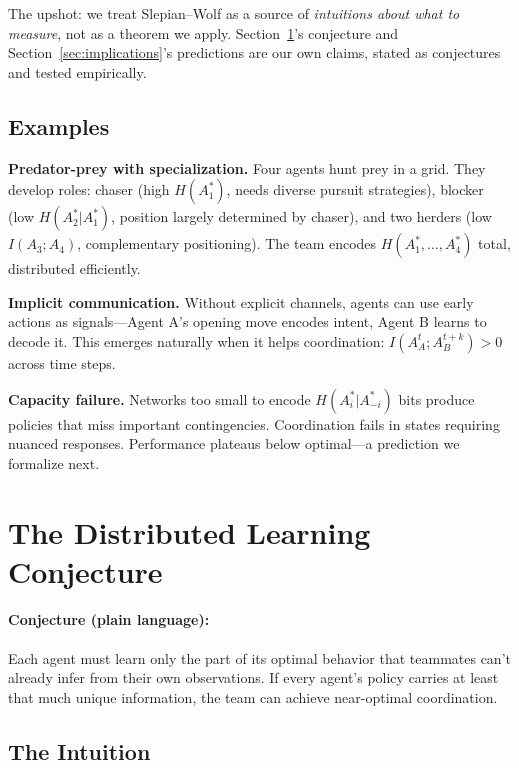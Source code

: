 \documentclass[10pt, letterpaper]{article}
\begin{document}
The upshot: we treat Slepian--Wolf as a source of \emph{intuitions about what to measure}, not as a theorem we apply. Section~\ref{sec:conjecture}'s conjecture and Section~\ref{sec:implications}'s predictions are our own claims, stated as conjectures and tested empirically.

\subsection{Examples}

\textbf{Predator-prey with specialization.} Four agents hunt prey in a grid. They develop roles: chaser (high $H(A_1^*)$, needs diverse pursuit strategies), blocker (low $H(A_2^*|A_1^*)$, position largely determined by chaser), and two herders (low $I(A_3; A_4)$, complementary positioning). The team encodes $H(A_1^*, \ldots, A_4^*)$ total, distributed efficiently.

\textbf{Implicit communication.} Without explicit channels, agents can use early actions as signals---Agent A's opening move encodes intent, Agent B learns to decode it. This emerges naturally when it helps coordination: $I(A_A^t; A_B^{t+k}) > 0$ across time steps.

\textbf{Capacity failure.} Networks too small to encode $H(A_i^*|A_{-i}^*)$ bits produce policies that miss important contingencies. Coordination fails in states requiring nuanced responses. Performance plateaus below optimal---a prediction we formalize next.

\section{The Distributed Learning Conjecture}
\label{sec:conjecture}

\paragraph{Conjecture (plain language):} Each agent must learn only the part of its optimal behavior that teammates can't already infer from their own observations. If every agent's policy carries at least that much unique information, the team can achieve near-optimal coordination.

\subsection{The Intuition}
\end{document}
